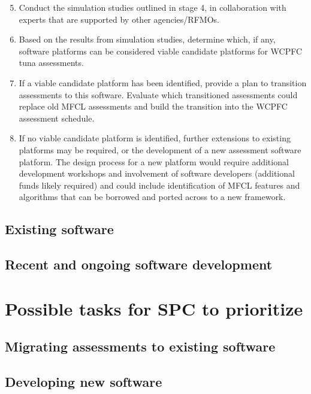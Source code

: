 \documentclass{SCreport}
\begin{document}
\begin{enumerate}\setcounter{enumi}{4}
  \item Conduct the simulation studies outlined in stage 4, in collaboration
  with experts that are supported by other agencies/RFMOs.
  \item Based on the results from simulation studies, determine which, if any,
  software platforms can be considered viable candidate platforms for WCPFC tuna
  assessments.
  \item If a viable candidate platform has been identified, provide a plan to
  transition assessments to this software. Evaluate which transitioned
  assessments could replace old MFCL assessments and build the transition into
  the WCPFC assessment schedule.
  \item If no viable candidate platform is identified, further extensions to
  existing platforms may be required, or the development of a new assessment
  software platform. The design process for a new platform would require
  additional development workshops and involvement of software developers
  (additional funds likely required) and could include identification of MFCL
  features and algorithms that can be borrowed and ported across to a new
  framework.
\end{enumerate}

\subsection{Existing software}

\subsection{Recent and ongoing software development}

\section{Possible tasks for SPC to prioritize}

\subsection{Migrating assessments to existing software}

\subsection{Developing new software}
\end{document}
